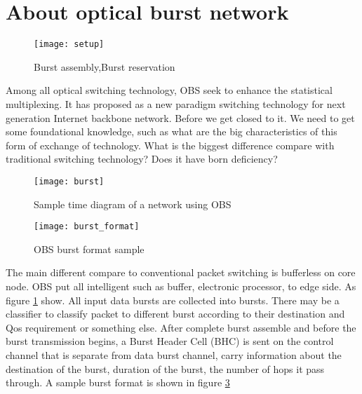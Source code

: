 \section{About optical burst network}

\begin{figure}[!htbp]
    \label{fig:obstransstep}
    \begin{center}
        \leavevmode
        \ifpdf
        \else
        \texttt{[image: setup]}
        \fi
        \caption{Burst assembly,Burst reservation}
    \end{center}
\end{figure}

Among all optical switching technology, OBS seek to enhance the statistical multiplexing. It has proposed as a new paradigm switching technology for next generation Internet backbone network. Before we get closed to it. We need to get some foundational knowledge, such as what are the big characteristics of this form of exchange of technology. What is the biggest difference compare with traditional switching technology? Does it have born deficiency? 

\begin{figure}[!htb]
    \label{fig:obstime}
    \begin{center}
        \leavevmode
        \ifpdf
        \else
        \texttt{[image: burst]}
        \fi
        \caption{Sample time diagram of a network using OBS}
    \end{center}
\end{figure}

\begin{figure}[!htb]
    \label{fig:burst_format}
    \begin{center}
        \leavevmode
        \ifpdf
        \else
        \texttt{[image: burst\_format]}
        \fi
        \caption{OBS burst format sample}
    \end{center}
\end{figure}

The main different compare to conventional packet switching is bufferless on core node. OBS put all intelligent such as buffer, electronic processor, to edge side. As figure \ref{fig:obstransstep} show. All input data bursts are collected into bursts. There may be a classifier to classify packet to different burst according to their destination and Qos requirement or something else. After complete burst assemble and before the burst
transmission begins, a Burst Header Cell (BHC) is sent on the control channel that is separate from data burst channel, carry information about the destination of the burst, duration of the burst, the number of hops it pass through. A sample burst format is shown in figure \ref{fig:burst_format}

